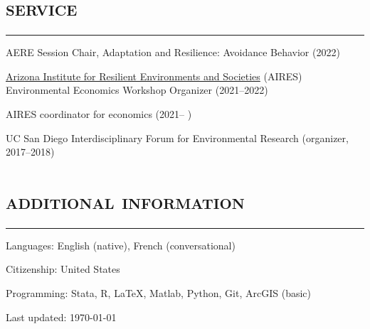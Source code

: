 \documentclass[letterpaper]{article}
\def\footerlink{}
\renewenvironment{itemize}{
  \begin{list}{}{
    \setlength{\leftmargin}{1em}
      \setlength{\itemsep}{0.25em}
    \setlength{\parskip}{0pt}
    \setlength{\parsep}{0pt} 
  }
}{
  \end{list}
}
\begin{document}
{\section*{\textsc{\textbf{service}}}
\hrule
\vspace{.2cm}

\begin{itemize}
\item AERE Session Chair, Adaptation and Resilience: Avoidance Behavior (2022)
\item  \href{https://environment.arizona.edu/air}{Arizona Institute for Resilient Environments and Societies} (AIRES) Environmental Economics Workshop Organizer (2021--2022)
\item AIRES coordinator for economics (2021-- )
\item UC San Diego Interdisciplinary Forum for Environmental Research (organizer, 2017--2018)
\end{itemize}

\section*{\textsc{\textbf{additional information}}}
\hrule
\vspace{.2cm}


\begin{itemize}
    \item Languages: English (native), French (conversational)
    \item Citizenship: United States
    \item Programming: Stata, R, \LaTeX, Matlab, Python, Git, ArcGIS (basic)
\end{itemize}









\bigskip

\begin{center}
  \begin{footnotesize}
    Last updated: 
\today
{} \\
  \end{footnotesize}
\end{center}
\end{document}
